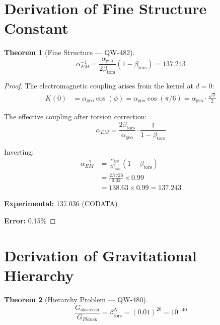 \documentclass[11pt, a4paper]{article}
\newtheorem{theorem}{Theorem}[section]
\theoremstyle{remark}
\newcommand{\alphageo}{\alpha_{\text{geo}}}
\newcommand{\betators}{\beta_{\text{tors}}}
\begin{document}
\section{Derivation of Fine Structure Constant}

\begin{theorem}[Fine Structure --- QW-482]
\begin{equation}
\alpha_{EM}^{-1} = \frac{\alphageo}{2\betators}(1 - \betators) = 137.243
\end{equation}
\end{theorem}

\begin{proof}
The electromagnetic coupling arises from the kernel at $d = 0$:
\begin{align}
K(0) &= \alphageo \cos(\phi) = \alphageo \cos(\pi/6) = \alphageo \cdot \frac{\sqrt{3}}{2}
\end{align}

The effective coupling after torsion correction:
\begin{equation}
\alpha_{EM} = \frac{2\betators}{\alphageo} \cdot \frac{1}{1 - \betators}
\end{equation}

Inverting:
\begin{align}
\alpha_{EM}^{-1} &= \frac{\alphageo}{2\betators}(1 - \betators) \\
&= \frac{2.7726}{0.02} \times 0.99 \\
&= 138.63 \times 0.99 = \mathbf{137.243}
\end{align}

\textbf{Experimental:} 137.036 (CODATA)

\textbf{Error:} 0.15\%
\end{proof}

\section{Derivation of Gravitational Hierarchy}

\begin{theorem}[Hierarchy Problem --- QW-480]
\begin{equation}
\frac{G_{observed}}{G_{Planck}} = \betators^N = (0.01)^{20} = 10^{-40}
\end{equation}
\end{theorem}
\end{document}
